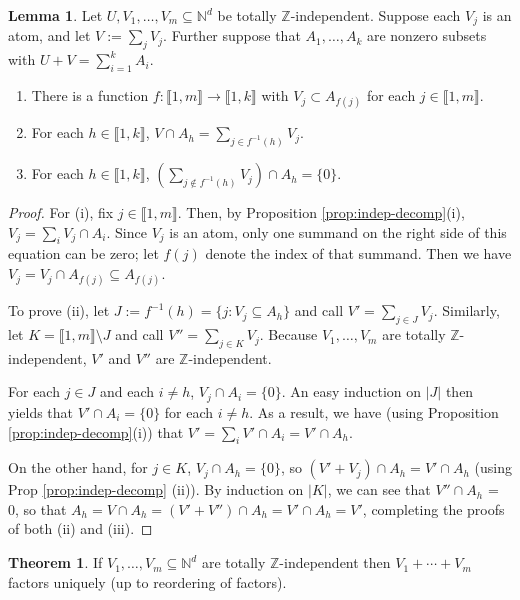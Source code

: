 \documentclass{report}
\newcommand{\NN}{\mathbb{N}}
\newcommand{\ZZ}{\mathbb{Z}}
\newcommand{\llb}{\llbracket}
\newcommand{\rrb}{\rrbracket}
\renewcommand{\:}{\text{:}}
\theoremstyle{definition}
\newtheorem{lemma}[defn]{Lemma}
\newtheorem{thm}[defn]{Theorem}
\begin{document}
\begin{lemma} \label{lem:indep-atom-decomp}
Let $U, V_1,\dots, V_m\subseteq \NN^d$ be totally $\ZZ$-independent.
Suppose each $V_j$ is an atom, and let $V := \sum_j V_j$.
Further suppose that $A_1,\dots, A_k$ are nonzero subsets with $U+V = \sum_{i=1}^k A_i$.
\begin{enumerate}[label={\rm (\roman{*})}]
	\item There is a function $f: \llb 1,m \rrb \to \llb 1,k \rrb$ with $V_j \subset A_{f(j)}$ for each $j\in \llb 1,m\rrb$.
	\item For each $h\in \llb 1,k\rrb$, $V\cap A_h = \sum\limits_{j\in f^{-1}(h)} V_j$.
	\item For each $h\in \llb 1,k\rrb$, $\left( \sum\limits_{j\notin f^{-1}(h)} V_j \right) \cap A_h = \{0\}$.
\end{enumerate}
\end{lemma}

\begin{proof}
For (i), fix $j\in \llb 1,m \rrb$.
Then, by Proposition \ref{prop:indep-decomp}(i), $V_j = \sum_i V_j \cap A_i$.
Since $V_j$ is an atom, only one summand on the right side of this equation can be zero; let $f(j)$ denote the index of that summand.
Then we have $V_j = V_j \cap A_{f(j)} \subseteq A_{f(j)}$.

To prove (ii), let $J := f^{-1}(h) = \{j: V_j \subseteq A_h\}$ and call $V' = \sum_{j\in J} V_j$.
Similarly, let $K = \llb 1,m \rrb \setminus J$ and call $V'' = \sum_{j\in K} V_j$.
Because $V_1,\dots, V_m$ are totally $\ZZ$-independent, $V'$ and $V''$ are $\ZZ$-independent.

For each $j\in J$ and each $i\neq h$, $V_j\cap A_i = \{0\}$. 
An easy induction on $|J|$ then yields that $V' \cap A_i = \{0\}$ for each $i\neq h$.
As a result, we have (using Proposition \ref{prop:indep-decomp}(i)) that $V' = \sum_i V'\cap A_i = V' \cap A_h$.

On the other hand, for $j\in K$, $V_j\cap A_h = \{0\}$, so $(V' + V_j) \cap A_h = V' \cap A_h$ (using Prop \ref{prop:indep-decomp} (ii)).
By induction on $|K|$, we can see that $V'' \cap A_h$ = 0, so that $A_h = V\cap A_h = (V' + V'')\cap A_h = V' \cap A_h = V'$, completing the proofs of both (ii) and (iii).
\end{proof}

\begin{thm} \label{thm:ind-atoms}
If $V_1,\dots,V_m\subseteq \NN^d$ are totally $\ZZ$-independent then $V_1+\cdots+V_m$ factors uniquely (up to reordering of factors).
\end{thm}
\end{document}
